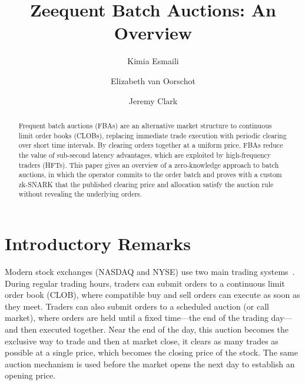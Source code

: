 \documentclass[runningheads]{llncs}
\begin{document}
\title{Zeequent Batch Auctions: An Overview}

\author{Kimia Esmaili \and Elizabeth van Oorschot \and Jeremy Clark}


\maketitle  

\begin{abstract}

Frequent batch auctions (FBAs) are an alternative market structure to continuous limit order books (CLOBs), replacing immediate trade execution with periodic clearing over short time intervals. By clearing orders together at a uniform price, FBAs reduce the value of sub-second latency advantages, which are exploited by high-frequency traders (HFTs). This paper gives an overview of a zero-knowledge approach to batch auctions, in which the operator commits to the order batch and proves with a custom zk-SNARK that the published clearing price and allocation satisfy the auction rule without revealing the underlying orders.

\end{abstract}

\section{Introductory Remarks}

Modern stock exchanges (\eg NASDAQ and NYSE) use two main trading systems~\cite{Har03}. During regular trading hours, traders can submit orders to a continuous limit order book (CLOB), where compatible buy and sell orders can execute as soon as they meet. Traders can also submit orders to a scheduled auction (or call market), where orders are held until a fixed time---the end of the trading day---and then executed together. Near the end of the day, this auction becomes the exclusive way to trade and then at market close, it clears as many trades as possible at a single price, which becomes the closing price of the stock. The same auction mechanism is used before the market opens the next day to establish an opening price.
\end{document}
